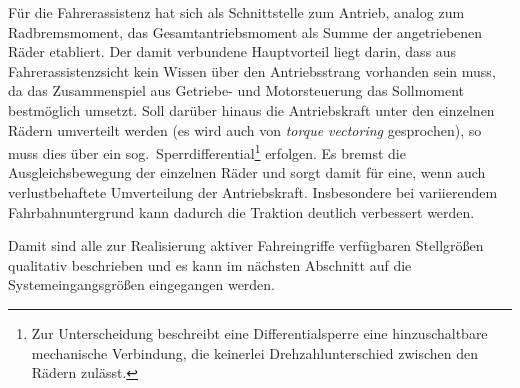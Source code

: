 Für die Fahrerassistenz hat sich als Schnittstelle zum Antrieb, analog zum Radbremsmoment, das Gesamtantriebsmoment als Summe der angetriebenen Räder etabliert. Der damit verbundene Hauptvorteil liegt darin, dass aus Fahrerassistenzsicht kein Wissen über den Antriebsstrang vorhanden sein muss, da das Zusammenspiel aus Getriebe- und Motorsteuerung das Sollmoment bestmöglich umsetzt. 
Soll darüber hinaus die Antriebskraft unter den einzelnen Rädern umverteilt werden (es wird auch von \emph{torque vectoring} \cite{piyabongkarn2007use, fallah2012controller} gesprochen), so muss dies über ein sog.\ Sperrdifferential\footnote{Zur Unterscheidung beschreibt eine Differentialsperre eine hinzuschaltbare mechanische Verbindung, die keinerlei Drehzahlunterschied zwischen den Rädern zulässt.} erfolgen. Es bremst die Ausgleichsbewegung der einzelnen Räder und sorgt damit für eine, wenn auch verlustbehaftete Umverteilung der Antriebskraft. Insbesondere bei variierendem Fahrbahnuntergrund kann dadurch die Traktion deutlich verbessert werden.%

Damit sind alle zur Realisierung aktiver Fahreingriffe verfügbaren Stellgrößen qualitativ beschrieben und es kann im nächsten Abschnitt auf die Systemeingangsgrößen eingegangen werden.









